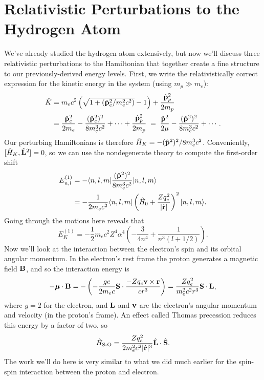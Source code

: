\documentclass[../p116main.tex]{subfiles}
\begin{document}
\section{Relativistic Perturbations to the Hydrogen Atom}
We've already studied the hydrogen atom extensively, but now we'll discuss three relativistic perturbations to the Hamiltonian that together create a fine structure to our previously-derived energy levels.
First, we write the relativistically correct expression for the kinetic energy in the system (using $m_p \gg m_e$):
\begin{align*}
    \hat K &= m_e c^2 \left( \sqrt{1 + (\hat{\mathbf{p}}_e^2 / m_e^2 c^2)} - 1 \right) + \frac{\hat{\mathbf{p}}_p^2}{2m_p} \\
    &= \frac{\hat{\mathbf{p}}_e^2}{2m_e} - \frac{(\hat{\mathbf{p}}_e^2)^2}{8m_e^3 c^2} + \cdots + \frac{\hat{\mathbf{p}}_p^2}{2m_p} \;=\; \frac{\hat{\mathbf{p}}^2}{2\mu} - \frac{(\hat{\mathbf{p}}^2)^2}{8m_e^3 c^2} + \cdots.
\end{align*}
Our perturbing Hamiltonians is therefore $\hat H_K = -(\hat{\mathbf{p}}^2)^2 / 8m_e^3 c^2$.
Conveniently, $[\hat H_K, \hat{\mathbf{L}}^2] = 0$, so we can use the nondegenerate theory to compute the first-order shift
\begin{align*}
    E_{n,l}^{(1)} &= - \langle{n,l,m}| \frac{(\hat{\mathbf{p}}^2)^2}{8m_e^3 c^2} |{n,l,m}\rangle \\
    &= -\frac{1}{2m_e c^2} \langle{n,l,m}| \left( \hat H_0 + \frac{Zq_e^2}{|\hat{\mathbf{r}}|} \right)^2 |{n,l,m}\rangle.
\end{align*}
Going through the motions here reveals that
\[ E_K^{(1)} = -\frac{1}{2} m_e c^2 Z^{4} \alpha^{4} \left( -\frac{3}{4n^{4}} + \frac{1}{n^3 (l + 1 / 2)} \right). \]
Now we'll look at the interaction between the electron's spin and its orbital angular momentum.
In the electron's rest frame the proton generates a magnetic field $\mathbf{B}$, and so the interaction energy is
\[ -\bm \mu \cdot \mathbf{B} = - \left( -\frac{ge}{2m_e c} \mathbf{S} \cdot \frac{-Z q_e \mathbf{v} \times \mathbf{r}}{c r^3} \right) = \frac{Zq_e^2}{m_e^2 c^2 r^3} \mathbf{S} \cdot \mathbf{L}, \]
where $g = 2$ for the electron, and $\mathbf{L}$ and $\mathbf{v}$ are the electron's angular momentum and velocity (in the proton's frame).
An effect called Thomas precession reduces this energy by a factor of two, so
\[ \hat H_\textrm{S-O} = \frac{Zq_e^2}{2m_e^2 c^2 |\hat{\mathbf{r}}|^3} \hat{\mathbf{L}} \cdot \hat{\mathbf{S}}. \]
The work we'll do here is very similar to what we did much earlier for the spin-spin interaction between the proton and electron.
\end{document}
